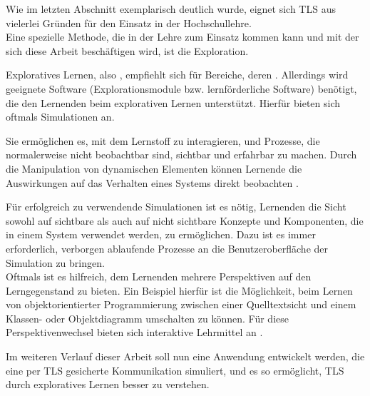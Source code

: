Wie im letzten Abschnitt exemplarisch deutlich wurde, eignet sich TLS aus vielerlei Gründen für den Einsatz in der Hochschullehre.\\
Eine spezielle Methode, die in der Lehre zum Einsatz kommen kann und mit der sich diese Arbeit beschäftigen wird, ist die Exploration.

Exploratives Lernen, also , empfiehlt sich für Bereiche, deren  \cite{schubert11}. 
Allerdings wird geeignete Software (Explorationsmodule bzw. lernförderliche Software) benötigt, die den Lernenden beim explorativen Lernen unterstützt. Hierfür bieten sich oftmals Simulationen an. 

\begin{quote}
 \cite{niegemann08}
\end{quote}

Sie ermöglichen es, mit dem Lernstoff zu interagieren, und Prozesse, die normalerweise nicht beobachtbar sind, sichtbar und erfahrbar zu machen. Durch die Manipulation von dynamischen Elementen können Lernende die Auswirkungen auf das Verhalten eines Systems direkt beobachten \cite{niegemann08}.

Für erfolgreich zu verwendende Simulationen ist es nötig, Lernenden die Sicht sowohl auf sichtbare als auch auf  nicht sichtbare Konzepte und Komponenten, die in einem System verwendet werden, zu ermöglichen. Dazu ist es immer erforderlich, verborgen ablaufende Prozesse an die Benutzeroberfläche der Simulation zu bringen. \\
Oftmals ist es hilfreich, dem Lernenden mehrere Perspektiven auf den Lerngegenstand zu bieten. Ein Beispiel hierfür ist die Möglichkeit, beim Lernen von objektorientierter Programmierung zwischen einer Quelltextsicht und einem Klassen- oder Objektdiagramm umschalten zu können. Für diese Perspektivenwechsel bieten sich interaktive Lehrmittel an \cite{schubert11}.

Im weiteren Verlauf dieser Arbeit soll nun eine Anwendung entwickelt werden, die eine per TLS gesicherte Kommunikation simuliert, und es so ermöglicht, TLS durch exploratives Lernen besser zu verstehen.
